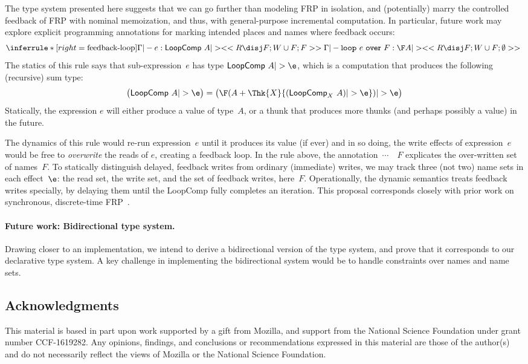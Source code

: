 \documentclass{purple}
\begin{document}
The type system presented here suggests that we can go further than
modeling FRP in isolation, and (potentially) marry the controlled
feedback of FRP with nominal memoization, and thus, with
general-purpose incremental computation.
%
In particular, future work may explore explicit programming
annotations for marking intended places and names where feedback
occurs:
\[
\Infer{feedback-loop}
{\Gamma |- e : \textsf{LoopComp}~A |> <<R\disj F; W \cup F; F>>}
{\Gamma |- \keyword{loop}~e~\keyword{over}~F : \F A |> <<R\disj F; W \cup F; \emptyset>>}
\]
%
The statics of this rule says that sub-expression~$e$ has type
$\textsf{LoopComp}~A |> \e$, which is a computation that produces the
following (recursive) sum type:
%
\[
\big(
  \textsf{LoopComp}~A |> \e
\big)
= 
\big(
  \F (A + \Thk{X}{(\textsf{LoopComp}_X~A) |> \e}) |> \e
\big)
\]
%
Statically, the expression $e$ will either produce a value of
type~$A$, or a thunk that produces more thunks (and perhaps possibly a
value) in the future.

The dynamics of this rule would re-run expression~$e$ until it
produces its value (if ever) and in so doing, the write effects of
expression~$e$ would be free to \emph{overwrite} the reads of $e$,
creating a feedback loop.
%
In the rule above, the annotation~$\cdots$~~$F$ explicates
the over-written set of names~$F$.
%
To statically distinguish delayed, feedback writes from ordinary
(immediate) writes, we may track three (not two) name sets in each
effect~$\e$: the read set, the write set, and the set of feedback
writes, here~$F$.
%
Operationally, the dynamic semantics treats feedback writes specially,
by delaying them until the \textsf{LoopComp} fully completes an
iteration.
%
This proposal corresponds closely with prior work on synchronous,
discrete-time FRP~\citep{DBLP:conf/icfp/KrishnaswamiB11}.

\paragraph{Future work: Bidirectional type system.}
%
Drawing closer to an implementation, we intend to derive a
bidirectional version of the type system, and prove that it
corresponds to our declarative type system.
A key challenge in implementing the bidirectional system
would be to handle constraints over names and name sets. 


\subsection{Acknowledgments}

This material is based in part upon work supported by a gift from
Mozilla, and support from the National Science Foundation under grant
number CCF-1619282.
%
Any opinions, findings, and conclusions or recommendations expressed
in this material are those of the author(s) and do not necessarily
reflect the views of Mozilla or the National Science Foundation.





\appendix
\end{document}
